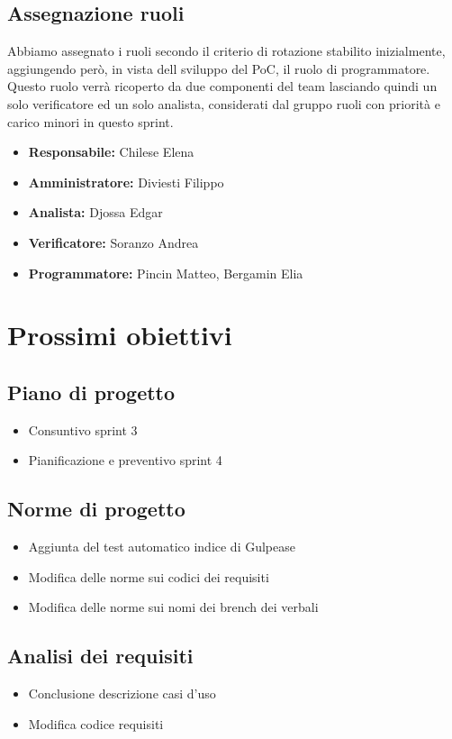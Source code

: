 \subsection{Assegnazione ruoli}
Abbiamo assegnato i ruoli secondo il criterio di rotazione stabilito inizialmente, aggiungendo però, in vista dell sviluppo del PoC, il ruolo di programmatore.
Questo ruolo verrà ricoperto da due componenti del team lasciando quindi un solo verificatore ed un solo analista, considerati dal gruppo ruoli con priorità e carico minori in questo sprint.
\begin{itemize}
    \item \textbf{Responsabile:} Chilese Elena
    \item \textbf{Amministratore:} Diviesti Filippo
    \item \textbf{Analista:} Djossa Edgar
    \item \textbf{Verificatore:} Soranzo Andrea
    \item \textbf{Programmatore:} Pincin Matteo, Bergamin Elia
\end{itemize}

\section{Prossimi obiettivi}

\subsection{Piano di progetto}
\begin{itemize}
    \item Consuntivo sprint 3
    \item Pianificazione e preventivo sprint 4
\end{itemize}

\subsection{Norme di progetto}
\begin{itemize}
    \item Aggiunta del test automatico indice di Gulpease
    \item Modifica delle norme sui codici dei requisiti
    \item Modifica delle norme sui nomi dei brench dei verbali
\end{itemize}

\subsection{Analisi dei requisiti}
\begin{itemize}
    \item Conclusione descrizione casi d'uso
    \item Modifica codice requisiti
\end{itemize}

